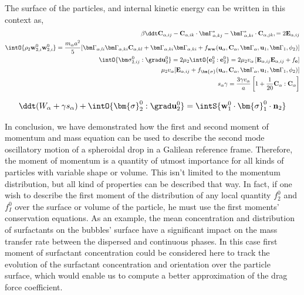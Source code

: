 The surface of the particles, and internal kinetic energy can be written in this context as, 
\begin{align*}
    \beta \ddt \textbf{C}_{\alpha,ij}
    - \textbf{C}_{\alpha,ik} \cdot \bm\Gamma_{\alpha,kj}^*
    - \bm\Gamma_{\alpha,ki}^* \cdot \textbf{C}_{\alpha,jk},
    = 
    2\textbf{E}_{\alpha,ij}\\
    \intO{\rho_2 \textbf{w}_{2,i}^0\textbf{w}_{2,i}^0}
    = \frac{m_\alpha a^2}{5}[
        \bm\Gamma_{\alpha,li}\bm\Gamma_{\alpha,ki} \textbf{C}_{\alpha,kl} 
        + \bm\Gamma_{\alpha,ki}\bm\Gamma_{\alpha,ki} 
        + f_\textbf{ww}(\textbf{u}_\alpha,\textbf{C}_\alpha,\bm\Gamma_\alpha,\textbf{u}_1,\bm \Gamma_1,\phi_2)
        ]
    \\
    \intO{\bm\sigma_{2,ij}^0:\grad \textbf{u}_2^0}
    = 2 \mu_2 \intO{\textbf{e}_2^0:\textbf{e}_2^0}
    = 2\mu_2v_\alpha\left[ \textbf{E}_{\alpha,ij}\textbf{E}_{\alpha,ij}
    + f_{\textbf{e}}\right]\\
    \mu_2 v_\alpha [\textbf{E}_{\alpha,ij}
    + f_{\bm{\sigma}}(\textbf{u}_\alpha,\textbf{C}_\alpha,\bm\Gamma_\alpha,\textbf{u}_1,\bm \Gamma_1,\phi_2)]
    \\
    s_\alpha \gamma
    = 
    \frac{3 \gamma v_\alpha }{a}\left[
        1
        + \frac{1}{20}\textbf{C}_\alpha:\textbf{C}_\alpha
    \right]
\end{align*}

\begin{equation}
    \ddt (W_\alpha + \gamma s_\alpha)
    + \intO{ \bm{\sigma}_2^0 : \grad\textbf{u}_2^0 }
    =\intS{\textbf{w}_1^0 \cdot \bm{\sigma}_1^0 \cdot \textbf{n}_2} 
\end{equation}

In conclusion, we have demonstrated how the first and second moment of momentum and mass equation can be used to describe the second mode oscillatory motion of a spheroidal drop in a Galilean reference frame. 
Therefore, the moment of momentum is a quantity of utmost importance for all kinds of particles with variable shape or volume.
This isn't limited to the momentum distribution, but all kind of properties can be described that way. 
In fact, if one wish to describe the first moment of the distribution of any local quantity $f_2^0$ and $f_I^0$ over the surface or volume of the particle, he must use the first moments' conservation equations. 
As an example, the mean concentration and distribution of surfactants on the bubbles' surface have a significant impact on the mass transfer rate between the dispersed and continuous phases.
In this case first moment of surfactant concentration could be considered here to track the evolution of the surfactant concentration and orientation over the particle surface, which would enable us to compute a better approximation of the drag force coefficient. 
